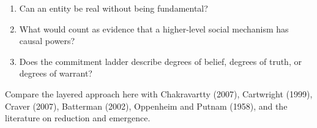 \begin{discussion}
\begin{enumerate}
\item Can an entity be real without being fundamental?
\item What would count as evidence that a higher-level social mechanism has
causal powers?
\item Does the commitment ladder describe degrees of belief, degrees of truth,
or degrees of warrant?
\end{enumerate}
\end{discussion}

\begin{furtherreading}
Compare the layered approach here with Chakravartty (2007), Cartwright (1999),
Craver (2007), Batterman (2002), Oppenheim and Putnam (1958), and the
literature on reduction and emergence.
\end{furtherreading}

